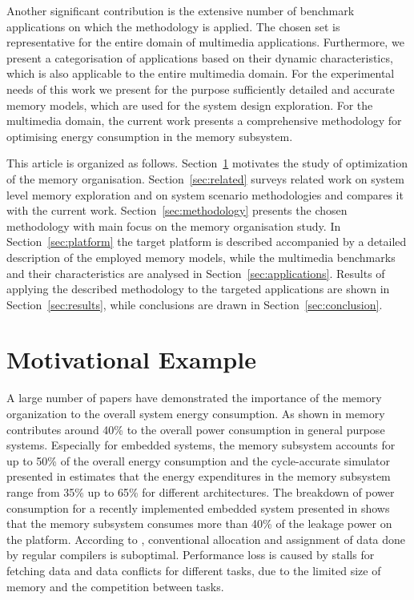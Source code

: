 \documentclass[smallcondensed]{svjour3}
\begin{document}
Another significant contribution is the extensive number of benchmark applications on which the methodology is applied.
The chosen set is representative for the entire domain of multimedia applications.
Furthermore, we present a categorisation of applications based on their dynamic characteristics, which is also applicable to the entire multimedia domain. 
For the experimental needs of this work we present for the purpose sufficiently detailed and accurate  memory models, which are used for the system design exploration.
For the multimedia domain, the current work presents a comprehensive methodology for optimising energy consumption in the memory subsystem.

This article is organized as follows. 
Section~\ref{sec:motivation} motivates the study of optimization of the memory organisation. 
Section~\ref{sec:related} surveys related work on system level memory exploration and on system scenario methodologies and compares it with the current work. 
Section~\ref{sec:methodology} presents the chosen methodology with main focus on the memory organisation study. 
In Section~\ref{sec:platform} the target platform is described accompanied by a detailed description of the employed memory models, while the multimedia benchmarks and their characteristics are analysed in Section~\ref{sec:applications}. 
Results of applying the described methodology to the targeted applications are shown in Section~\ref{sec:results}, while conclusions are drawn in Section~\ref{sec:conclusion}. 

\section{Motivational Example}
\label{sec:motivation}

A large number of papers have demonstrated the importance of the memory organization to the overall system energy consumption. 
As shown in \cite{Gonzalez1996} memory contributes around 40\% to the overall power consumption in general purpose systems. 
Especially for embedded systems, the memory subsystem accounts for up to 50\% of the overall energy consumption \cite{Che09} and the cycle-accurate simulator presented in \cite{Ben99} estimates that the energy expenditures in the memory subsystem range from 35\% up to 65\% for different architectures. 
The breakdown of power consumption for a recently implemented embedded system presented in \cite{Hul11} shows that the memory subsystem consumes more than 40\% of the leakage power on the platform. 
According to \cite{tcm}, conventional allocation and assignment of data done by regular compilers is suboptimal. 
Performance loss is caused by stalls for fetching data and data conflicts for different tasks, due to the limited size of memory and the competition between tasks. 
\end{document}
